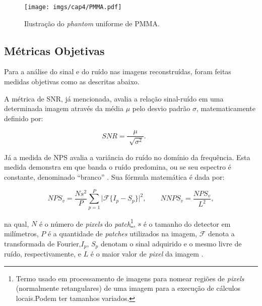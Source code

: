  \begin{figure}[H]
	\caption{Ilustração do \textit{phantom} uniforme de \acs{PMMA}.}
	\begin{center}
		\texttt{[image: imgs/cap4/PMMA.pdf]}
	\end{center}
	\label{fig:imgCap4PMMA}
\end{figure} 


\subsection{Métricas Objetivas} 

Para a análise do sinal e do ruído nas imagens reconstruídas, foram feitas medidas objetivas como as descritas abaixo.


A métrica de \acs{SNR}, já mencionada, avalia a relação sinal-ruído em uma determinada imagem através da média $\mu$ pelo desvio padrão $\sigma$, matematicamente definido por: 

 \begin{equation}
 SNR = \dfrac{\mu}{\sqrt[]{\sigma^{2}}}.    	\qquad 
 \label{eq:eqSNR}
 \end{equation}
 
 Já a medida de \acs{NPS} avalia a variância do ruído no domínio da frequência. Esta medida demonstra em que banda o ruído predomina, ou se seu espectro é constante, denominado ``branco'' \cite{bertalmiodenoising2018}. Sua fórmula matemática é dada por:
 
 \begin{equation}
 NPS_{v} = \dfrac{Ns^{2}}{P} \sum_{p=1}^{P}  \vert \mathcal{F}\{I_{p}-S_{p}\}\vert^{2},    	\qquad 
 NNPS_{v} = \dfrac{NPS_{v}}{L^{2}},	 
 \label{eq:eqNNPS}
 \end{equation}

\noindent na qual, $N$ é o número de \textit{pixels} do \textit{patch}\footnote{ Termo usado em processamento de imagens para nomear regiões de \textit{pixels} (normalmente retangulares) de uma imagem para a execução de cálculos locais.Podem ter tamanhos variados.}, $s$ é o tamanho do detector em milímetros, $P$ é a quantidade de \textit{patches} utilizados na imagem, $\mathcal{F}$  denota a transformada de Fourier,$I_{p}$, $S_{p}$ denotam o sinal adquirido e o mesmo livre de ruído, respectivamente, e $L$ é o maior valor de \textit{pixel} da imagem \cite{dobbins2000handbook}.

